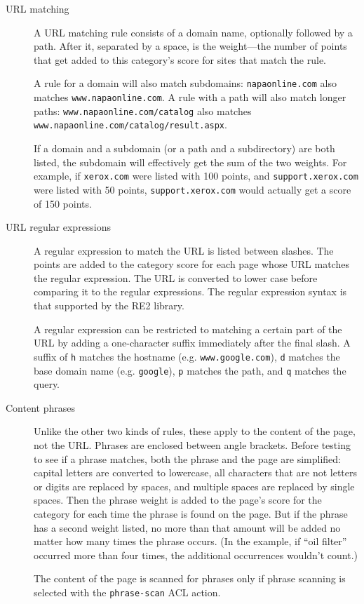 \documentclass{article}
\begin{document}
\begin{description}

\item[URL matching] A URL matching rule consists of a domain name, optionally followed by a path. 
After it, separated by a space, is the weight---the number of points that get added to this category's score 
for sites that match the rule. 

A rule for a domain will also match subdomains: \verb"napaonline.com" also matches \verb"www.napaonline.com".
A rule with a path will also match longer paths: \verb"www.napaonline.com/catalog" also matches 
\verb"www.napaonline.com/catalog/result.aspx".

If a domain and a subdomain (or a path and a subdirectory) 
are both listed, the subdomain will effectively get the sum of the two weights. For example, if \verb"xerox.com"
were listed with 100 points, and \verb"support.xerox.com" were listed with 50 points, \verb"support.xerox.com" 
would actually get a score of 150 points.

\item[URL regular expressions] A regular expression to match the URL is listed between slashes. 
The points are added to the category score for each page whose URL matches the regular expression. 
The URL is converted to lower case before comparing it to the regular expressions.
The regular expression syntax is that supported by the RE2 library.

A regular expression can be restricted to matching a certain part of the URL by adding a one-character suffix
immediately after the final slash.
A suffix of \verb"h" matches the hostname (e.g. \verb"www.google.com"), 
\verb"d" matches the base domain name (e.g. \verb"google"),
\verb"p" matches the path,
and \verb"q" matches the query.

\item[Content phrases] Unlike the other two kinds of rules, these apply to the content of the page, not the URL. 
Phrases are enclosed between angle brackets. Before testing to see if a phrase matches, 
both the phrase and the page are simplified: capital letters are converted to lowercase, 
all characters that are not letters or digits are replaced by spaces,
and multiple spaces are replaced by single spaces. Then the phrase weight is added to the page's score for the category 
for each time the phrase is found on the page. But if the phrase has a second weight listed, 
no more than that amount will be added no matter how many times the phrase occurs. 
(In the example, if ``oil filter'' occurred more than four times, the additional occurrences wouldn't count.)

The content of the page is scanned for phrases only if phrase scanning is selected with the \verb"phrase-scan" ACL action.

\end{description}
\end{document}
